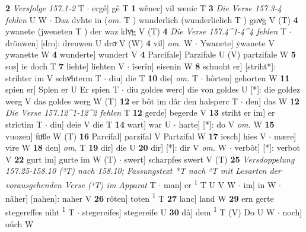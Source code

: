 \documentclass[8pt,a4paper,notitlepage]{article}
\begin{document}
\begin{table}[ht]
\begin{minipage}[t]{0.5\linewidth}
\textbf{2} \textit{Versfolge 157.1-2} T   $\cdot$ ergê] gê T \textbf{1} wênec] vil wenic T \textbf{3} \textit{Die Verse 157.3-4 fehlen} U W   $\cdot$ Daz dvhte in (\textit{om.} T ) wunderlich (wunderliclich T ) gnvͦg V (T) \textbf{4} ywanete (jweneten T ) der waz klvͦg V (T) \textbf{4} \textit{Die Verse 157.4\textasciicircum1-4\textasciicircum4 fehlen} T   $\cdot$ dröuwen] [dro]: dreuwen U droͮ V (W) \textbf{4} vil] \textit{om.} W  $\cdot$ Ywanete] ẏwanete V ywanette W \textbf{4} wunderte] wundert V \textbf{4} Parcifale] Parzifale U (V) partzifale W \textbf{5} sus] ie doch T \textbf{7} liehte] liehten V  $\cdot$ îserîn] eisenin W \textbf{8} schuoht er] [striht*]: strihter im V schvͦhterm T  $\cdot$ diu] die T \textbf{10} die] \textit{om.} T  $\cdot$ hôrten] gehorten W \textbf{11} spien er] Splen er U Er spien T  $\cdot$ diu goldes werc] die von goldes U [*]: die goldez werg V das goldes werg W (T) \textbf{12} er bôt im dâr den halsperc T  $\cdot$ den] das W \textbf{12} \textit{Die Verse 157.12\textasciicircum1-12\textasciicircum2 fehlen} T  \textbf{12} gerde] begerde V \textbf{13} striht er im] er strictim T  $\cdot$ diu] deie V die T \textbf{14} wart] war U  $\cdot$ harte] [*]: do V \textit{om.} W \textbf{15} vuozen] fuͦße W (T) \textbf{16} Parcifal] parzifal V Partzifal W \textbf{17} iesch] hies V  $\cdot$ mære] vire W \textbf{18} den] \textit{om.} T \textbf{19} dir] die U \textbf{20} dir] [*]: dir V \textit{om.} W  $\cdot$ verbôt] [*]: verbot V \textbf{22} gurt im] gurte im W (T)  $\cdot$ swert] scharpfes swert V (T) \textbf{25} \textit{Versdoppelung 157.25-158.10 (²T) nach 158.10; Fassungstext *T nach ²T mit Lesarten der vorausgehenden Verse (¹T) im Apparat} T   $\cdot$ man] er \textsuperscript{1}\hspace{-1.3mm} T U V W  $\cdot$ im] in W  $\cdot$ nâher] [nahen]: naher V \textbf{26} rôten] toten \textsuperscript{1}\hspace{-1.3mm} T \textbf{27} lanc] land W \textbf{29} ern gerte stegereffes niht \textsuperscript{1}\hspace{-1.3mm} T  $\cdot$ stegereifes] stegereife U \textbf{30} dâ] dem \textsuperscript{1}\hspace{-1.3mm} T (V) Do U W  $\cdot$ noch] oúch W \newline
\end{minipage}
\end{table}
\end{document}
